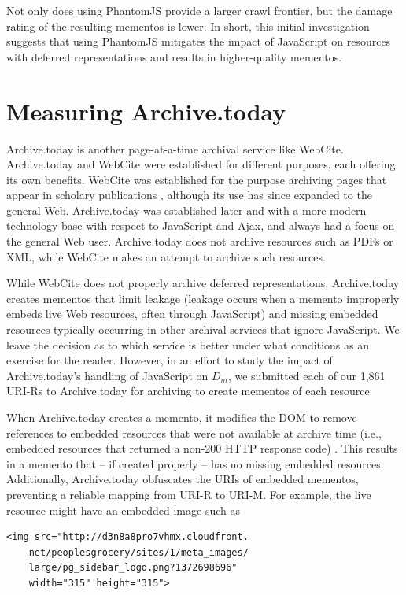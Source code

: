 Not only does using PhantomJS provide a larger crawl frontier, but the damage rating of the resulting mementos is lower. In short, this initial investigation suggests that using PhantomJS mitigates the impact of JavaScript on resources with deferred representations and results in higher-quality mementos.

\section{Measuring Archive.today}
\label{archivetoday}
Archive.today \cite{archivetoday} is another page-at-a-time archival service like WebCite. Archive.today and WebCite were established for different purposes, each offering its own benefits. WebCite was established for the purpose archiving pages that appear in scholary publications \cite{kleinLinkRot}, although its use has since expanded to the general Web.  Archive.today was established later and with a more modern technology base with respect to JavaScript and Ajax, and always had a focus on the general Web user. Archive.today does not archive resources such as PDFs or XML, while WebCite makes an attempt to archive such resources. 

While WebCite does not properly archive deferred representations, Archive.today creates mementos that limit leakage \cite{zombies, archiveisblog} (leakage occurs when a memento improperly embeds live Web resources, often through JavaScript) and missing embedded resources typically occurring in other archival services that ignore JavaScript. We leave the decision as to which service is better under what conditions as an exercise for the reader. However, in an effort to study the impact of Archive.today's handling of JavaScript on $D_m$, we submitted each of our 1,861 URI-Rs to Archive.today for archiving to create mementos of each resource. 

When Archive.today creates a memento, it modifies the DOM to remove references to embedded resources that were not available at archive time (i.e., embedded resources that returned a non-200 HTTP response code) \cite{refreshZombies}. This results in a memento that -- if created properly -- has no missing embedded resources. Additionally, Archive.today obfuscates the URIs of embedded mementos, preventing a reliable mapping from URI-R to URI-M. For example, the live resource might have an embedded image such as

\begin{verbatim}
<img src="http://d3n8a8pro7vhmx.cloudfront.
	net/peoplesgrocery/sites/1/meta_images/
	large/pg_sidebar_logo.png?1372698696" 
	width="315" height="315"> 
\end{verbatim}

